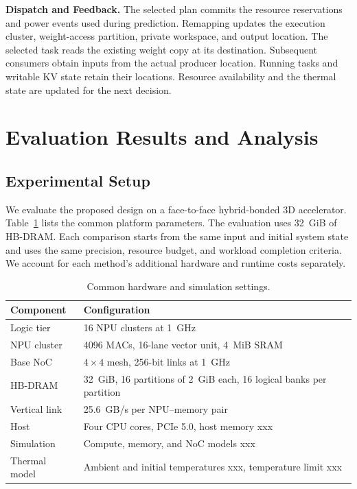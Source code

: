 \documentclass[conference,10pt]{IEEEtran}
\begin{document}
\noindent\textbf{Dispatch and Feedback.}
The selected plan commits the resource reservations and power events
used during prediction. Remapping updates the execution cluster,
weight-access partition, private workspace, and output location.
The selected task reads the existing weight copy at its destination.
Subsequent consumers obtain inputs from the actual producer location.
Running tasks and writable KV state retain their locations. Resource
availability and the thermal state are updated for the next decision.



\section{Evaluation Results and Analysis}
\label{sec:experiment}

\subsection{Experimental Setup}

We evaluate the proposed design on a face-to-face hybrid-bonded 3D accelerator. Table~\ref{tab:eval-platform} lists the common platform parameters. The evaluation uses 32~GiB of HB-DRAM. Each comparison starts from the same input and initial system state and uses the same precision, resource budget, and workload completion criteria. We account for each method's additional hardware and runtime costs separately.

\begin{table}[t]
\caption{Common hardware and simulation settings.}
\label{tab:eval-platform}
\centering\small
\begin{tabular}{@{}lp{}@{}}
\hline
Component & Configuration \\
\hline
Logic tier & 16 NPU clusters at 1~GHz \\
NPU cluster & 4096 MACs, 16-lane vector unit, 4~MiB SRAM \\
Base NoC & $4\times4$ mesh, 256-bit links at 1~GHz \\
HB-DRAM & 32~GiB, 16 partitions of 2~GiB each, 16 logical banks per partition \\
Vertical link & 25.6~GB/s per NPU--memory pair \\
Host & Four CPU cores, PCIe 5.0, host memory xxx \\
Simulation & Compute, memory, and NoC models xxx \\
Thermal model & Ambient and initial temperatures xxx, temperature limit xxx \\
\hline
\end{tabular}
\end{table}
\end{document}
